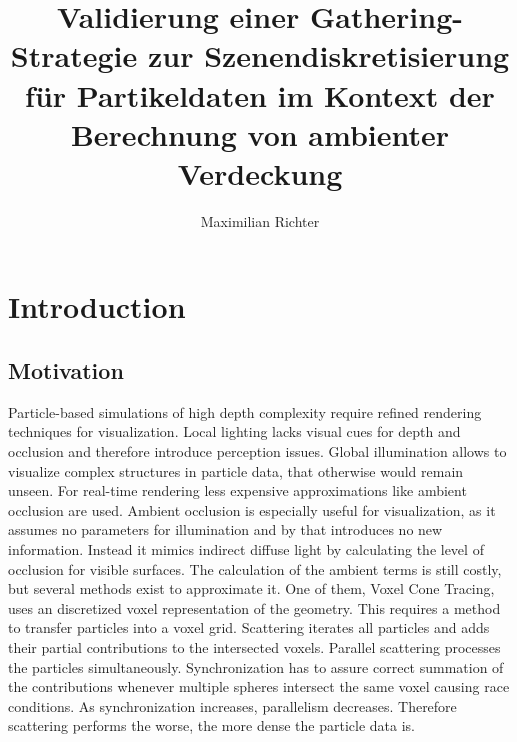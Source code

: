 \documentclass[hyperref,german,diplominf]{cgvpub}
\author{Maximilian Richter}
\title{Validierung einer Gathering-Strategie zur Szenendiskretisierung f\"ur Partikeldaten im Kontext der Berechnung von ambienter Verdeckung}
\begin{document}
\chapter{Introduction}

\section{Motivation}
Particle-based simulations of high depth complexity require refined rendering techniques for visualization. Local lighting lacks visual cues for depth and occlusion and therefore introduce perception issues.
Global illumination allows to visualize complex structures in particle data, that otherwise would remain unseen. For real-time rendering less expensive approximations like ambient occlusion are used. Ambient occlusion is especially useful for visualization, as it assumes no parameters for illumination and by that introduces no new information. Instead it mimics indirect diffuse light by calculating the level of occlusion for visible surfaces. The calculation of the ambient terms is still costly, but several methods exist to approximate it. One of them, Voxel Cone Tracing, uses an discretized voxel representation of the geometry. This requires a method to transfer particles into a voxel grid. Scattering iterates all particles and adds their partial contributions to the intersected voxels. Parallel scattering processes the particles simultaneously. Synchronization has to assure correct summation of the contributions whenever multiple spheres intersect the same voxel causing race conditions. As synchronization increases, parallelism decreases. Therefore scattering performs the worse, the more dense the particle data is.
\end{document}
